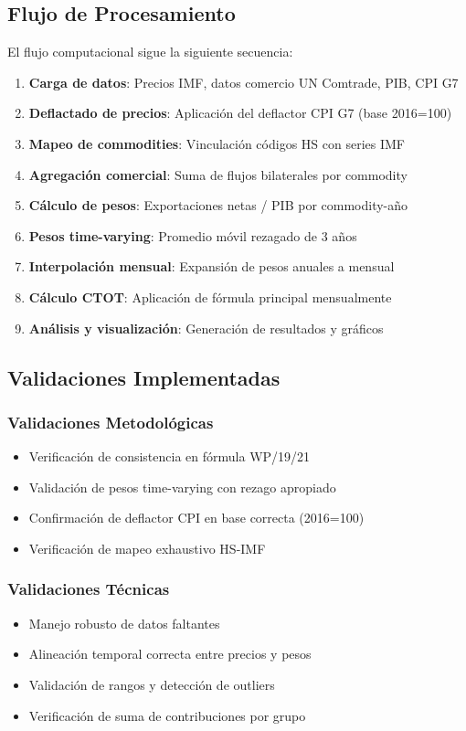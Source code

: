 \documentclass[12pt,a4paper]{article}
\begin{document}
\subsection{Flujo de Procesamiento}

El flujo computacional sigue la siguiente secuencia:

\begin{enumerate}
    \item \textbf{Carga de datos}: Precios IMF, datos comercio UN Comtrade, PIB, CPI G7
    \item \textbf{Deflactado de precios}: Aplicación del deflactor CPI G7 (base 2016=100)
    \item \textbf{Mapeo de commodities}: Vinculación códigos HS con series IMF
    \item \textbf{Agregación comercial}: Suma de flujos bilaterales por commodity
    \item \textbf{Cálculo de pesos}: Exportaciones netas / PIB por commodity-año
    \item \textbf{Pesos time-varying}: Promedio móvil rezagado de 3 años
    \item \textbf{Interpolación mensual}: Expansión de pesos anuales a mensual
    \item \textbf{Cálculo CTOT}: Aplicación de fórmula principal mensualmente
    \item \textbf{Análisis y visualización}: Generación de resultados y gráficos
\end{enumerate}

\subsection{Validaciones Implementadas}

\subsubsection{Validaciones Metodológicas}
\begin{itemize}
    \item Verificación de consistencia en fórmula WP/19/21
    \item Validación de pesos time-varying con rezago apropiado
    \item Confirmación de deflactor CPI en base correcta (2016=100)
    \item Verificación de mapeo exhaustivo HS-IMF
\end{itemize}

\subsubsection{Validaciones Técnicas}
\begin{itemize}
    \item Manejo robusto de datos faltantes
    \item Alineación temporal correcta entre precios y pesos
    \item Validación de rangos y detección de outliers
    \item Verificación de suma de contribuciones por grupo
\end{itemize}
\end{document}
